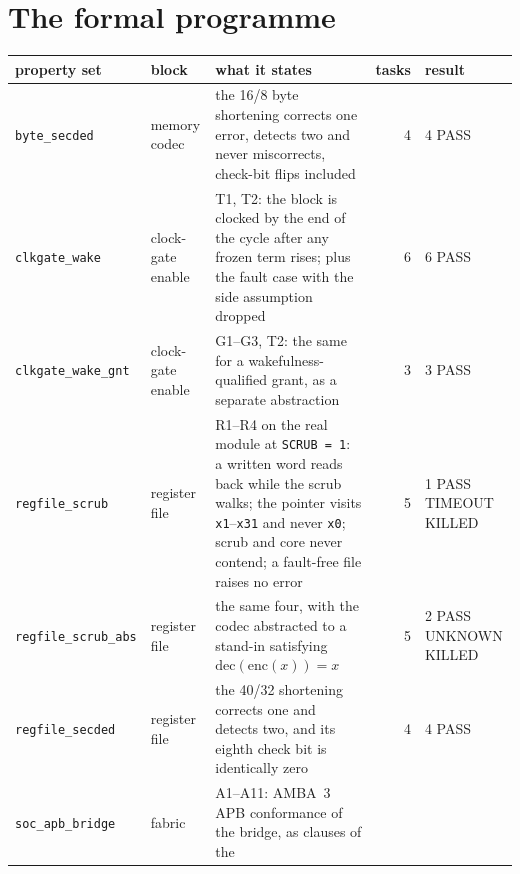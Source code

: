\documentclass[11pt,a4paper]{article}
\newcommand{\file}[1]{\texttt{\small #1}}
\begin{document}
\section{The formal programme}
\label{sec:formal}

\begin{table}[p]
\centering
\scriptsize
\setlength{\tabcolsep}{4pt}
\renewcommand{\arraystretch}{1.0}
\begin{tabular}{L{2.7cm}L{1.7cm}L{7.0cm}rL{2.1cm}}
\toprule
property set & block & what it states & tasks & result \\
\midrule
\file{byte\_secded} & memory codec &
  the \num{16}/\num{8} byte shortening corrects one error, detects two
  and never miscorrects, check-bit flips included & 4 & 4 PASS \\
\file{clkgate\_wake} & clock-gate enable &
  T1, T2: the block is clocked by the end of the cycle after any frozen
  term rises; plus the fault case with the side assumption dropped &
  6 & 6 PASS \\
\file{clkgate\_\allowbreak wake\_gnt} & clock-gate enable &
  G1--G3, T2: the same for a wakefulness-qualified grant, as a separate
  abstraction & 3 & 3 PASS \\
\file{regfile\_scrub} & register file &
  R1--R4 on the real module at \texttt{SCRUB = 1}: a written word reads
  back while the scrub walks; the pointer visits
  \texttt{x1}--\texttt{x31} and never \texttt{x0}; scrub and core never
  contend; a fault-free file raises no error & 5 &
  1 PASS TIMEOUT KILLED \\
\file{regfile\_\allowbreak scrub\_abs} & register file &
  the same four, with the codec abstracted to a stand-in satisfying
  $\mathrm{dec}(\mathrm{enc}(x)) = x$ & 5 &
  2 PASS UNKNOWN KILLED \\
\file{regfile\_secded} & register file &
  the \num{40}/\num{32} shortening corrects one and detects two, and its
  eighth check bit is identically zero & 4 & 4 PASS \\
\file{soc\_apb\_\allowbreak bridge} & fabric &
  A1--A11: AMBA~3 APB conformance of the bridge, as clauses of the

\end{tabular}
\end{table}
\end{document}
